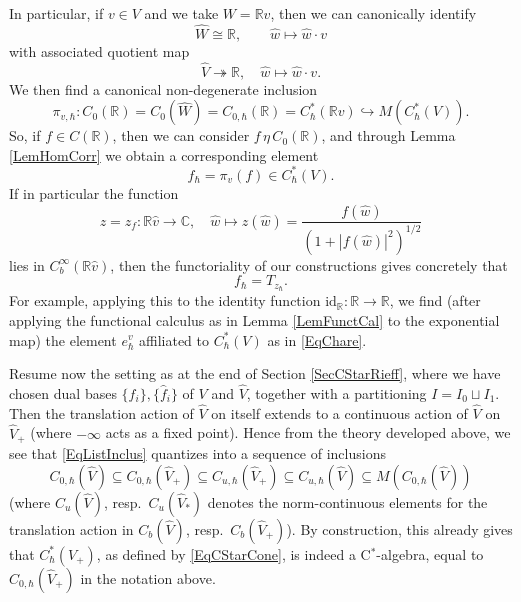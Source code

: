 \documentclass[11pt, reqno]{amsart}
\theoremstyle{definition}
\numberwithin{equation}{section}
\def\C{\mathbb C}
\def\R{\mathbb R}
\newcommand{\id}{\mathrm{id}}
\begin{document}
In particular, if $v \in V$ and we take $W =\R v$, then we can canonically identify 
\begin{equation}\label{EqIdentHatWR}
\hat{W} \cong \R,\qquad \hat{w}\mapsto \hat{w}\cdot v 
\end{equation}
with associated quotient map 
\begin{equation}\label{EqIdentHatWRQuot}
\hat{V} \twoheadrightarrow \R,\quad \hat{w}\mapsto \hat{w}\cdot v.
\end{equation}
We then find a canonical non-degenerate inclusion
\begin{equation}\label{EqVectIncl}
\pi_{v,\hbar}\colon  C_0(\R) = C_0(\hat{W}) = C_{0,\hbar}(\R) = C_{\hbar}^*(\R v) \hookrightarrow M(C^*_{\hbar}(V)).
\end{equation}
So, if $f\in C(\R)$, then we can consider $f \,\eta \,C_0(\R)$, and through Lemma \ref{LemHomCorr} we obtain a corresponding element 
\[
f_{\hbar} = \pi_v(f) \in C^*_{\hbar}(V).
\]
If in particular the function 
\[
z = z_f\colon  \R \hat{v}\rightarrow \C,\quad \hat{w} \mapsto z(\hat{w}) = \frac{f(\hat{w})}{(1+|f(\hat{w})|^2)^{1/2}}
\]
lies in $C_b^{\infty}(\R \hat{v})$, then the functoriality of our constructions gives concretely that
\[
f_{\hbar} = T_{z_{\hbar}}.
\]
For example, applying this to the identity function $\id_{\R}\colon  \R\rightarrow \R$, we find (after applying the functional calculus as in Lemma \ref{LemFunctCal} to the exponential map) the element $e_{\hbar}^v$ affiliated to $C_{\hbar}^*(V)$ as in \eqref{EqChare}.

Resume now the setting as at the end of Section \ref{SecCStarRieff}, where we have chosen dual bases $\{f_i\},\{\hat{f}_i\}$ of $V$ and $\hat{V}$, together with a partitioning $I = I_0 \sqcup I_1$. Then the translation action of $\hat{V}$ on itself extends to a continuous action of $\hat{V}$ on $\hat{V}_+$ (where $-\infty$ acts as a fixed point). Hence from the theory developed above, we see that \eqref{EqListInclus} quantizes into a sequence of inclusions
\begin{equation}\label{EqListInclusQuant}
C_{0,\hbar}(\hat{V}) \subseteq C_{0,\hbar}(\hat{V}_+) \subseteq C_{u,\hbar}(\hat{V}_+) \subseteq C_{u,\hbar}(\hat{V}) \subseteq M(C_{0,\hbar}(\hat{V}))
\end{equation}
(where $C_u(\hat{V})$, resp.\ $C_u(\hat{V}_*)$ denotes the norm-continuous elements for the translation action in $C_b(\hat{V})$, resp.\ $C_b(\hat{V}_+)$). By construction, this already gives that $C^*_{\hbar}(V_+)$, as defined by \eqref{EqCStarCone}, is indeed a C$^*$-algebra, equal to $C_{0,\hbar}(\hat{V}_+)$ in the notation above. 
\end{document}
